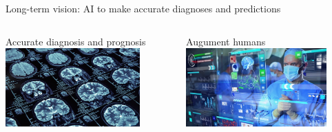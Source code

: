 \documentclass[8pt,xcolor=table,aspectratio=169]{beamer}
\begin{document}
\begin{frame}{Long-term vision: AI to make accurate diagnoses and predictions}


\vspace{-2em}
\begin{columns}[t]
\begin{column}{0.5\textwidth}
\centering


Accurate diagnosis and prognosis\\
\includegraphics[height=3cm]{ai-diagnosis}





\end{column}
\begin{column}{0.5\textwidth}
\centering


Augument humans\\
\includegraphics[height=3cm]{ai-assist}

% 
% 


\end{column}
\end{columns}




\end{frame}
\end{document}
